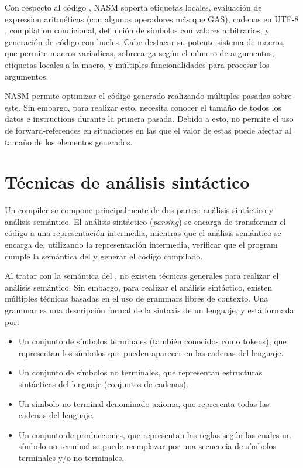 Con respecto al código , NASM soporta etiquetas
locales, evaluación de \gls{expression} aritméticas (con algunos operadores más
que GAS), cadenas en UTF-8 \parencite{UTF-8}, \gls{compilation} condicional,
definición de símbolos con valores arbitrarios, y generación de código con
bucles. Cabe destacar su potente sistema de macros, que permite macros
variadicas, sobrecarga según el número de argumentos, etiquetas locales a la
macro, y múltiples funcionalidades para procesar los argumentos.

NASM permite optimizar el código generado realizando múltiples pasadas sobre
este. Sin embargo, para realizar esto, necesita conocer el tamaño de todos los
datos e \glspl{instruction} durante la primera pasada. Debido a esto, no permite
el uso de \glspl{forward-reference} en situaciones en las que el valor de estas
puede afectar al tamaño de los elementos generados. \parencite{NASM-manual}

\section{Técnicas de análisis sintáctico}\label{sec:parser-techniques}

Un \gls{compiler} se compone principalmente de dos partes: análisis sintáctico y
análisis semántico. El análisis sintáctico (\textit{parsing}) se encarga de
transformar el código a una representación intermedia, mientras que el análisis
semántico se encarga de, utilizando la representación intermedia, verificar que
el \gls{program} cumple la semántica del 
y generar el código compilado. \parencite{dragon-book}

Al tratar con la semántica del , no
existen técnicas generales para realizar el análisis semántico. Sin embargo,
para realizar el análisis sintáctico, existen múltiples técnicas basadas en el
uso de \glspl{grammar} libres de contexto. Una \gls{grammar} es una descripción
formal de la sintaxis de un lenguaje, y está formada por:
\parencite{dragon-book}

\begin{itemize}
    \item Un conjunto de símbolos terminales (también conocidos como
    \glspl{token}), que representan los símbolos que pueden aparecer en las
    cadenas del lenguaje.
    \item Un conjunto de símbolos no terminales, que representan estructuras
    sintácticas del lenguaje (conjuntos de cadenas).
    \item Un símbolo no terminal denominado axioma, que representa todas las
    cadenas del lenguaje.
    \item Un conjunto de producciones, que representan las reglas según las
    cuales un símbolo no terminal se puede reemplazar por una secuencia de
    símbolos terminales y/o no terminales.
\end{itemize}

